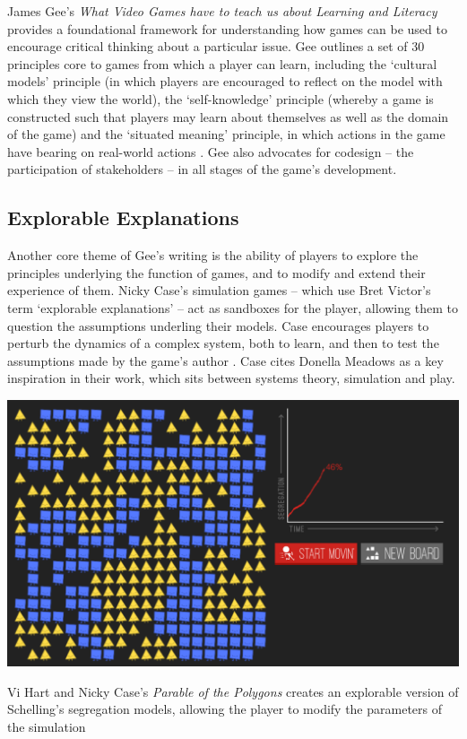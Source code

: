 \documentclass[nofonts,nols,justified,nobib]{tufte-book}
\begin{document}
James Gee's \emph{What Video Games have to teach us about Learning and Literacy} provides a foundational framework for understanding how games can be used to encourage critical thinking about a particular issue. Gee outlines a set of 30 principles core to games from which a player can learn, including the `cultural models' principle (in which players are encouraged to reflect on the model with which they view the world), the `self-knowledge' principle (whereby a game is constructed such that players may learn about themselves as well as the domain of the game) and the `situated meaning' principle, in which actions in the game have bearing on real-world actions \cite{gee_what_2004}. Gee also advocates for codesign -- the participation of stakeholders -- in all stages of the game's development.

\subsection*{Explorable Explanations}
Another core theme of Gee's writing is the ability of players to explore the principles underlying the function of games, and to modify and extend their experience of them. Nicky Case's simulation games -- which use Bret Victor's term `explorable explanations' -- act as sandboxes for the player, allowing them to question the assumptions underling their models. Case encourages players to perturb the dynamics of a complex system, both to learn, and then to test the assumptions made by the game's author \cite{case_how_2016}. Case cites Donella Meadows as a key inspiration in their work, which sits between systems theory, simulation and play. 


\begin{marginfigure}
\includegraphics[width=\textwidth]{img/1/parable.png}
\caption{Vi Hart and Nicky Case's \emph{Parable of the Polygons} creates an explorable version of Schelling's segregation models, allowing the player to modify the parameters of the simulation \label{b} \cite{case_parable_2015}}
\end{marginfigure}
\end{document}
